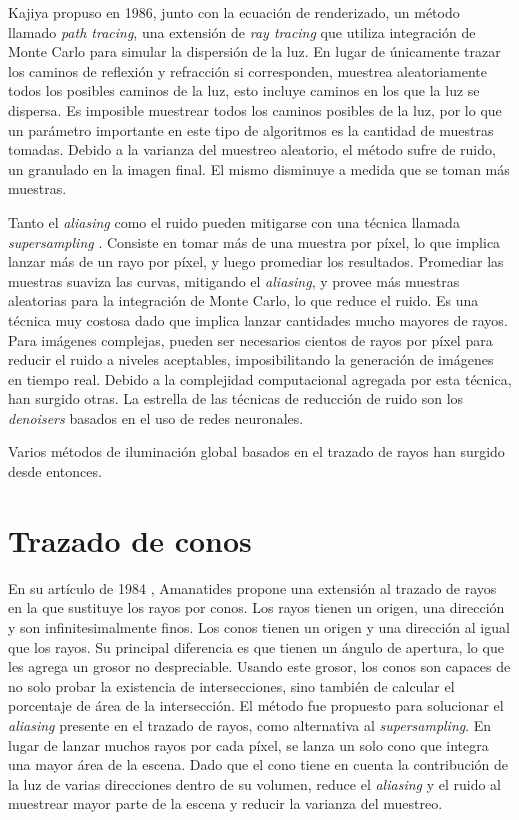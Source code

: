 Kajiya propuso en 1986\cite{rendering-equation}, junto con la ecuación de renderizado, un método llamado \textit{path tracing}, una extensión de \textit{ray tracing} que utiliza integración de Monte Carlo para simular la dispersión de la luz.
En lugar de únicamente trazar los caminos de reflexión y refracción si corresponden, muestrea aleatoriamente todos los posibles caminos de la luz, esto incluye caminos en los que la luz se dispersa.
Es imposible muestrear todos los caminos posibles de la luz, por lo que un parámetro importante en este tipo de algoritmos es la cantidad de muestras tomadas.
Debido a la varianza del muestreo aleatorio, el método sufre de ruido, un granulado en la imagen final.
El mismo disminuye a medida que se toman más muestras.


Tanto el \textit{aliasing} como el ruido pueden mitigarse con una técnica llamada \textit{supersampling} \cite{whitted-1980}. %
Consiste en tomar más de una muestra por píxel, lo que implica lanzar más de un rayo por píxel, y luego promediar los resultados.
Promediar las muestras suaviza las curvas, mitigando el \textit{aliasing}, y provee más muestras aleatorias para la integración de Monte Carlo, lo que reduce el ruido.
Es una técnica muy costosa dado que implica lanzar cantidades mucho mayores de rayos.
Para imágenes complejas, pueden ser necesarios cientos de rayos por píxel para reducir el ruido a niveles aceptables, imposibilitando la generación de imágenes en tiempo real.
Debido a la complejidad computacional agregada por esta técnica, han surgido otras.
La estrella de las técnicas de reducción de ruido son los \textit{denoisers} basados en el uso de redes neuronales. %

Varios métodos de iluminación global basados en el trazado de rayos han surgido desde entonces.

\section{Trazado de conos}\label{sec:historical-cone-tracing}

En su artículo de 1984 \cite{ray-tracing-with-cones}, Amanatides propone una extensión al trazado de rayos en la que sustituye los rayos por conos.
Los rayos tienen un origen, una dirección y son infinitesimalmente finos.
Los conos tienen un origen y una dirección al igual que los rayos.
Su principal diferencia es que tienen un ángulo de apertura, lo que les agrega un grosor no despreciable.
Usando este grosor, los conos son capaces de no solo probar la existencia de intersecciones, sino también de calcular el porcentaje de área de la intersección.
El método fue propuesto para solucionar el \textit{aliasing} presente en el trazado de rayos, como alternativa al \textit{supersampling}.
En lugar de lanzar muchos rayos por cada píxel, se lanza un solo cono que integra una mayor área de la escena.
Dado que el cono tiene en cuenta la contribución de la luz de varias direcciones dentro de su volumen, reduce el \textit{aliasing} y el ruido al muestrear mayor parte de la escena y reducir la varianza del muestreo.

